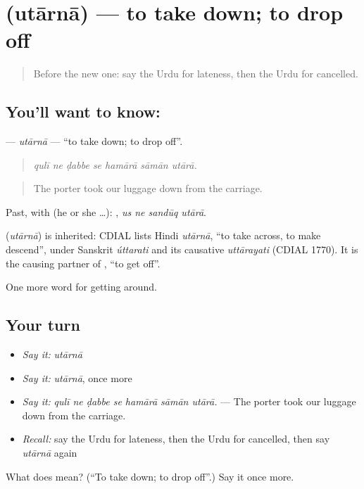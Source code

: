 \section[\texorpdfstring{\ur{اتارنا} (utārnā)}{اتارنا (utārnā)}]{ (utārnā) — to take down; to drop off}

\label{lesson:UR-C390-utaarna}



\begin{quote}
Before the new one: say the Urdu for lateness, then the Urdu for cancelled.
\end{quote}

\subsection*{You'll want to know: }
\textbf{} — \emph{utārnā} — \textquotedblleft{}to take down; to drop off\textquotedblright{}.

\begin{quote}
      
\end{quote}

\begin{quote}
\emph{qulī ne ḍabbe se hamārā sāmān utārā.}
\end{quote}

\begin{quote}
The porter took our luggage down from the carriage.
\end{quote}

Past, with  (he or she …):    , \emph{us ne sandūq utārā}.

\begin{cousinweb}
\textbf{} (\emph{utārnā}) is inherited: CDIAL lists Hindi \emph{utārnā}, \textquotedblleft{}to take across, to make descend\textquotedblright{}, under Sanskrit \emph{úttarati} and its causative \emph{uttārayati} (CDIAL 1770). It is the causing partner of \textbf{}, \textquotedblleft{}to get off\textquotedblright{}.
\end{cousinweb}

\begin{grammarlens}[title={What you've built}]
One more word for getting around.
\end{grammarlens}

\subsection*{Your turn}
\begin{itemize}
\raggedright
  \item \emph{Say it:} \emph{utārnā}
  \item \emph{Say it:} \emph{utārnā}, once more
  \item \emph{Say it:} \emph{qulī ne ḍabbe se hamārā sāmān utārā.} — The porter took our luggage down from the carriage.
  \item \emph{Recall:} say the Urdu for lateness, then the Urdu for cancelled, then say \emph{utārnā} again
\end{itemize}

\begin{tcolorbox}[breakable,colback=teal!4,colframe=teal!35!black,title={Before you move on}]
What does  mean? (\textquotedblleft{}To take down; to drop off\textquotedblright{}.) Say it once more.
\end{tcolorbox}
